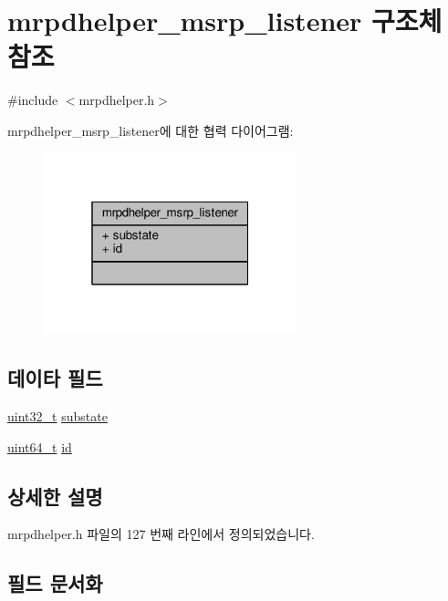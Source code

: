 \hypertarget{structmrpdhelper__msrp__listener}{}\section{mrpdhelper\+\_\+msrp\+\_\+listener 구조체 참조}
\label{structmrpdhelper__msrp__listener}


{\ttfamily \#include $<$mrpdhelper.\+h$>$}



mrpdhelper\+\_\+msrp\+\_\+listener에 대한 협력 다이어그램\+:
\nopagebreak
\begin{figure}[H]
\begin{center}
\leavevmode
\includegraphics[width=208pt]{structmrpdhelper__msrp__listener__coll__graph}
\end{center}
\end{figure}
\subsection*{데이타 필드}
\begin{DoxyCompactItemize}
\item 
\hyperlink{parse_8c_a6eb1e68cc391dd753bc8ce896dbb8315}{uint32\+\_\+t} \hyperlink{structmrpdhelper__msrp__listener_a77fc98efbb49dcae027e0dde935b7070}{substate}
\item 
\hyperlink{parse_8c_aec6fcb673ff035718c238c8c9d544c47}{uint64\+\_\+t} \hyperlink{structmrpdhelper__msrp__listener_a7e290573ef1be67b92a2c745e3b00d1d}{id}
\end{DoxyCompactItemize}


\subsection{상세한 설명}


mrpdhelper.\+h 파일의 127 번째 라인에서 정의되었습니다.



\subsection{필드 문서화}
